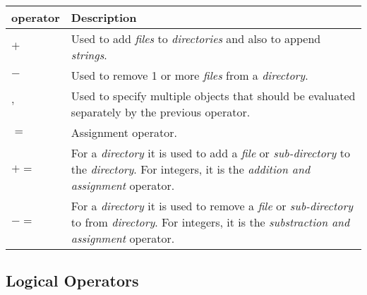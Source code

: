 \documentclass[11pt]{article}
\begin{document}
\begin{table}[ht]
  \centering
  \vspace{0.5em}
  \begin{tabular}{|m{8em}|b{34em}|}
  \hline

  \textbf{operator}
  &
  \vspace{0.7em}
  \textbf{Description} \\ [0.7em]
  \hline

  $+$
  &
  \vspace{0.7em}
  Used to add \emph{files} to \emph{directories} and also to append \emph{strings}.
  \\[0.7em]
  \hline

  $-$
  &
  \vspace{0.7em}
  Used to remove 1 or more \emph{files} from a \emph{directory}.
  \\[0.7em]
  \hline

  $,$
  &
  \vspace{0.7em}
  Used to specify multiple objects that should be evaluated separately by the previous operator.
  \\[0.7em]
  \hline

  $=$
  &
  \vspace{0.7em}
  Assignment operator.
  \\[0.7em]
  \hline

  $+=$
  &
  \vspace{0.7em}
  For a \emph{directory} it is used to add a \emph{file} or \emph{sub-directory} to the \emph{directory}. For integers, it is the \emph{addition and assignment} operator.
  \\[0.7em]
  \hline

  $-=$
  &
  \vspace{0.7em}
  For a \emph{directory} it is used to remove a \emph{file} or \emph{sub-directory} to from \emph{directory}. For integers, it is the \emph{substraction and assignment} operator.
  \\[0.7em]
  \hline

  \end{tabular}
\end{table}

\subsection{Logical Operators}
\end{document}
